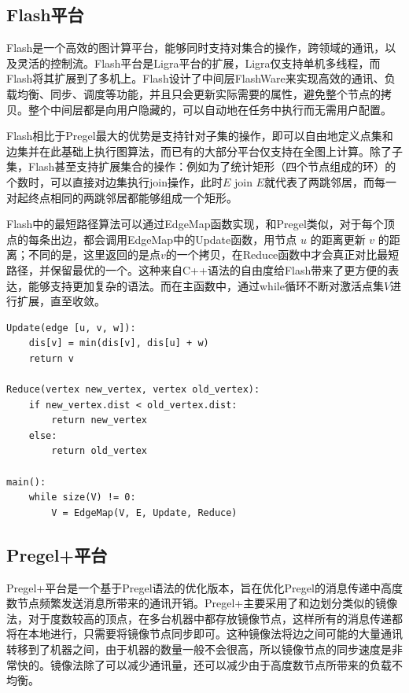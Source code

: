\subsection{Flash平台}

Flash是一个高效的图计算平台，能够同时支持对集合的操作，跨领域的通讯，以及灵活的控制流。Flash平台是Ligra平台的扩展，Ligra仅支持单机多线程，而Flash将其扩展到了多机上。Flash设计了中间层FlashWare来实现高效的通讯、负载均衡、同步、调度等功能，并且只会更新实际需要的属性，避免整个节点的拷贝。整个中间层都是向用户隐藏的，可以自动地在任务中执行而无需用户配置。

Flash相比于Pregel最大的优势是支持针对子集的操作，即可以自由地定义点集和边集并在此基础上执行图算法，而已有的大部分平台仅支持在全图上计算。除了子集，Flash甚至支持扩展集合的操作：例如为了统计矩形（四个节点组成的环）的个数时，可以直接对边集执行join操作，此时$E$ join $E$就代表了两跳邻居，而每一对起终点相同的两跳邻居都能够组成一个矩形。

Flash中的最短路径算法可以通过EdgeMap函数实现，和Pregel类似，对于每个顶点的每条出边，都会调用EdgeMap中的Update函数，用节点 $u$ 的距离更新 $v$ 的距离；不同的是，这里返回的是点$v$的一个拷贝，在Reduce函数中才会真正对比最短路径，并保留最优的一个。这种来自C++语法的自由度给Flash带来了更方便的表达，能够支持更加复杂的语法。而在主函数中，通过while循环不断对激活点集$V$进行扩展，直至收敛。

\begin{lstlisting}
Update(edge [u, v, w]):
    dis[v] = min(dis[v], dis[u] + w)
    return v

Reduce(vertex new_vertex, vertex old_vertex):
    if new_vertex.dist < old_vertex.dist:
        return new_vertex
    else:
        return old_vertex

main():
    while size(V) != 0:
        V = EdgeMap(V, E, Update, Reduce)
\end{lstlisting}


\subsection{Pregel+平台}

Pregel+平台是一个基于Pregel语法的优化版本，旨在优化Pregel的消息传递中高度数节点频繁发送消息所带来的通讯开销。Pregel+主要采用了和边划分类似的镜像法，对于度数较高的顶点，在多台机器中都存放镜像节点，这样所有的消息传递都将在本地进行，只需要将镜像节点同步即可。这种镜像法将边之间可能的大量通讯转移到了机器之间，由于机器的数量一般不会很高，所以镜像节点的同步速度是非常快的。镜像法除了可以减少通讯量，还可以减少由于高度数节点所带来的负载不均衡。

